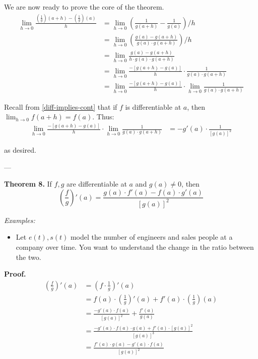 \vs

We are now ready to prove the core of the theorem.
\begin{align*}
  \lim_{h\to0}\frac{\left(\frac{1}{g}\right)(a+h)-\left(\frac{1}{g}\right)(a)}{h}
  &=\lim_{h\to0}\left(\frac{1}{g(a+h)}-\frac{1}{g(a)}\right)/h\\
  &=\lim_{h\to0}\left(\frac{g(a)-g(a+h)}{g(a)\cdot g(a+h)}\right)/h\\
  &=\lim_{h\to0}\frac{g(a)-g(a+h)}{h\cdot g(a)\cdot g(a+h)}\\
  &=\lim_{h\to0}\frac{-[g(a+h)-g(a)]}{h}\cdot\frac{1}{g(a)\cdot g(a+h)}\\
  &=\lim_{h\to0}\frac{-[g(a+h)-g(a)]}{h}\cdot\lim_{h\to0}\frac{1}{g(a)\cdot
    g(a+h)}
\end{align*}

Recall from \ref{diff-implies-cont} that if $f$ is differentiable at
$a$, then $\lim_{h\to0}f(a+h)=f(a)$. Thus:
\begin{align*}
  \lim_{h\to0}\frac{-[g(a+h)-g(a)]}{h}\cdot\lim_{h\to0}\frac{1}{g(a)\cdot g(a+h)}
  &=-g'(a)\cdot \frac{1}{[g(a)]^2}
\end{align*}

as desired.

\vs---\vs

\textbf{Theorem 8.} If $f, g$ are differentiable at $a$ and $g(a)\neq0$, then
\[\left(\frac{f}{g}\right)'(a)=\frac{g(a)\cdot f'(a)-f(a)\cdot g'(a)}{[g(a)]^2}\]

\vs

\textit{Examples:}
\begin{itemize}
\item Let $e(t), s(t)$ model the number of engineers and sales people
  at a company over time. You want to understand the change in the
  ratio between the two.
\end{itemize}

\textbf{Proof.}
\begin{align*}
  \left(\frac{f}{g}\right)'(a)&=\left(f\cdot\frac{1}{g}\right)'(a)\\
  &=f(a)\cdot
    \left(\frac{1}{g}\right)'(a)+f'(a)\cdot\left(\frac{1}{g}\right)(a)\\
  &=\frac{-g'(a)\cdot f(a)}{[g(a)]^2}+\frac{f'(a)}{g(a)}\\
  &=\frac{-g'(a)\cdot f(a)\cdot g(a)+f'(a)\cdot [g(a)]^2}{[g(a)]^3}\\
  &=\frac{f'(a)\cdot g(a)-g'(a)\cdot f(a)}{[g(a)]^2}\\
\end{align*}

